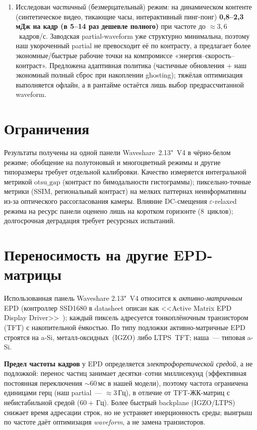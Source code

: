\begin{enumerate}
        эмпирически как наиболее устойчивая, \S\ref{sec:metric}).
    \item Исследован \emph{частичный} (безмерцательный) режим: на динамическом
        контенте (синтетическое видео, тикающие часы, интерактивный пинг-понг)
        \textbf{0{,}8--2{,}3\,мДж на кадр (в 5--14 раз дешевле полного)} при частоте
        до $\approx3{,}6$~кадров/с. Заводская partial-waveform уже структурно
        минимальна, поэтому наш укороченный partial не превосходит её по контрасту,
        а предлагает более экономные/быстрые рабочие точки на компромиссе
        «энергия--скорость--контраст». Предложена адаптивная политика (частичные
        обновления + наш экономный полный сброс при накоплении ghosting); тяжёлая
        оптимизация выполняется офлайн, а в рантайме остаётся лишь выбор
        предрассчитанной waveform.
\end{enumerate}

\section*{Ограничения}

Результаты получены на одной панели Waveshare~2.13"~V4 в чёрно-белом режиме;
обобщение на полутоновый и многоцветный режимы и другие типоразмеры требует
отдельной калибровки. Качество измеряется интегральной метрикой
$\mathrm{otsu\_gap}$ (контраст по бимодальности гистограммы); пиксельно-точные
метрики (SSIM, региональный контраст) на мелких паттернах неинформативны из-за
оптического рассогласования камеры. Влияние DC-смещения
$\varepsilon$-relaxed режима на ресурс панели оценено лишь на коротком горизонте
(8~циклов); долгосрочная деградация требует ресурсных испытаний.

\section*{Переносимость на другие EPD-матрицы}

Использованная панель Waveshare 2.13"~V4 относится к \emph{активно-матричным} EPD (контроллер
SSD1680 в datasheet описан как <<Active Matrix EPD Display Driver>>~\cite{ssd1680_datasheet});
каждый пиксель адресуется тонкоплёночным транзистором (TFT) с накопительной ёмкостью.
По типу подложки активно-матричные EPD строятся на a-Si, металл-оксидных~(IGZO) либо
LTPS~TFT; наша~--- типовая a-Si.

\textbf{Предел частоты кадров} у EPD определяется \emph{электрофоретической средой}, а не
подложкой: перенос частиц занимает десятки--сотни миллисекунд
(эффективная постоянная переключения $\sim\!60$\,мс в нашей модели), поэтому частота
ограничена единицами герц (наш partial~--- $\approx3$\,Гц), в отличие от
TFT-ЖК-матриц с небистабильной средой ($60+$\,Гц). Более быстрый backplane (IGZO/LTPS)
снижает время адресации строк, но не устраняет инерционность среды; выигрыш по
частоте даёт оптимизация \emph{waveform}, а не замена транзисторов.

